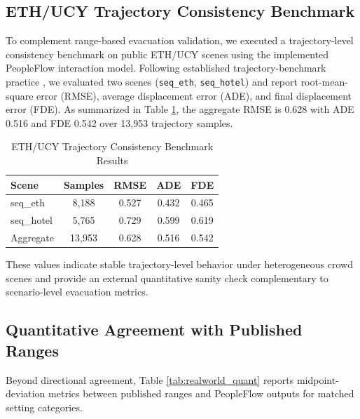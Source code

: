 \documentclass[journal]{IEEEtran}
\begin{document}
\subsection{ETH/UCY Trajectory Consistency Benchmark}
To complement range-based evacuation validation, we executed a trajectory-level consistency benchmark on public ETH/UCY scenes using the implemented PeopleFlow interaction model. Following established trajectory-benchmark practice \cite{pellegrini2009eth,alahi2016sociallstm,gupta2018socialgan,salzmann2020trajectron,mohamed2020stgcnn}, we evaluated two scenes (\texttt{seq\_eth}, \texttt{seq\_hotel}) and report root-mean-square error (RMSE), average displacement error (ADE), and final displacement error (FDE). As summarized in Table \ref{tab:eth_validation}, the aggregate RMSE is 0.628 with ADE 0.516 and FDE 0.542 over 13,953 trajectory samples.

\begin{table}[!tb]
\centering
\caption{ETH/UCY Trajectory Consistency Benchmark Results}
\label{tab:eth_validation}
{\footnotesize
\setlength{\tabcolsep}{3pt}
\begin{tabular}{lcccc}
\toprule
\textbf{Scene} & \textbf{Samples} & \textbf{RMSE} & \textbf{ADE} & \textbf{FDE} \\
\midrule
seq\_eth & 8,188 & 0.527 & 0.432 & 0.465 \\
seq\_hotel & 5,765 & 0.729 & 0.599 & 0.619 \\
\midrule
Aggregate & 13,953 & 0.628 & 0.516 & 0.542 \\
\bottomrule
\end{tabular}
}
\end{table}

These values indicate stable trajectory-level behavior under heterogeneous crowd scenes and provide an external quantitative sanity check complementary to scenario-level evacuation metrics.

\subsection{Quantitative Agreement with Published Ranges}
Beyond directional agreement, Table \ref{tab:realworld_quant} reports midpoint-deviation metrics between published ranges and PeopleFlow outputs for matched setting categories.
\end{document}
